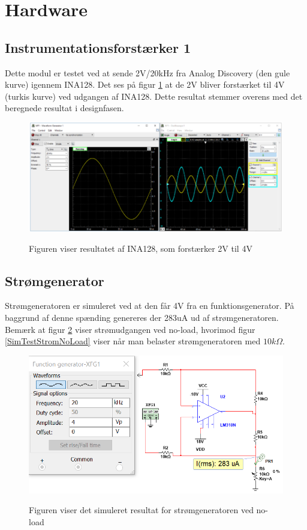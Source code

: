 \section{Hardware}

\subsection{Instrumentationsforstærker 1}
Dette modul er testet ved at sende 2V/20kHz fra Analog Discovery (den gule kurve) igennem INA128. Det ses på figur \ref{TestINA} at de 2V bliver forstærket til 4V (turkis kurve) ved udgangen af INA128. Dette resultat stemmer overens med det beregnede resultat i designfasen.    

\begin{figure}[H] 
\centering
{\includegraphics[width=\linewidth]
{Figure/TestINA1281}}
\caption{Figuren viser resultatet af INA128, som forstærker 2V til 4V}
\label{TestINA}
\end{figure}
  \pagebreak
\subsection{Strømgenerator}

Strømgeneratoren er simuleret ved at den får 4V fra en funktionsgenerator. På baggrund af denne spænding genereres der 283uA ud af strømgeneratoren. Bemærk at figur \ref{SimTestStrom} viser strømudgangen ved no-load, hvorimod figur \ref{SimTestStromNoLoad} viser når man belaster strømgeneratoren med $ 10k\Omega$.  

\begin{figure}[H] 
\centering
{\includegraphics[width=\linewidth]
{Figure/SimuleretStromGenerator}}
\caption{Figuren viser det simuleret resultat for  strømgeneratoren ved no-load}
\label{SimTestStrom}
\end{figure}



